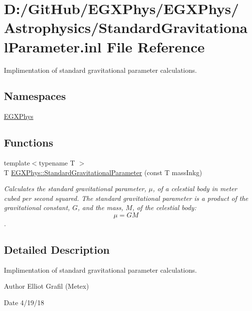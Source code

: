 \hypertarget{_standard_gravitational_parameter_8inl}{}\section{D\+:/\+Git\+Hub/\+E\+G\+X\+Phys/\+E\+G\+X\+Phys/\+Astrophysics/\+Standard\+Gravitational\+Parameter.inl File Reference}
\label{_standard_gravitational_parameter_8inl}


Implimentation of standard gravitational parameter calculations.  


\subsection*{Namespaces}
\begin{DoxyCompactItemize}
\item 
 \mbox{\hyperlink{namespace_e_g_x_phys}{E\+G\+X\+Phys}}
\end{DoxyCompactItemize}
\subsection*{Functions}
\begin{DoxyCompactItemize}
\item 
{\footnotesize template$<$typename T $>$ }\\T \mbox{\hyperlink{group___e_g_x_phys-_astrophysics-_standard_gravitational_parameter_ga37f4ed78b0fc23603b49ade3e435ea20}{E\+G\+X\+Phys\+::\+Standard\+Gravitational\+Parameter}} (const T mass\+Inkg)
\begin{DoxyCompactList}\small\item\em Calculates the standard gravitational parameter, $\mu$, of a celestial body in meter cubed per second squared. The standard gravitational parameter is a product of the gravitational constant, $G$, and the mass, $M$, of the celestial body\+: \[\mu = GM\]. \end{DoxyCompactList}\end{DoxyCompactItemize}


\subsection{Detailed Description}
Implimentation of standard gravitational parameter calculations. 

\begin{DoxyAuthor}{Author}
Elliot Grafil (Metex) 
\end{DoxyAuthor}
\begin{DoxyDate}{Date}
4/19/18 
\end{DoxyDate}
